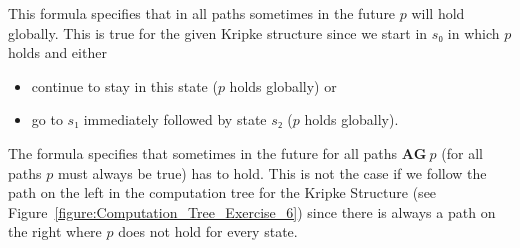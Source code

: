 \begin{description}[style=multiline, leftmargin=3cm]

    \item[$s₀⊧\mathbf{AF}(\mathbf{G}~p)$] This formula specifies that in all
    paths sometimes in the future $p$ will hold globally. This is true for the
    given Kripke structure since we start in $s₀$ in which $p$ holds and either

        \begin{itemize}

            \item continue to stay in this state ($p$ holds globally) or

            \item go to $s₁$ immediately followed by state $s₂$ ($p$ holds
            globally).

        \end{itemize}

    \item[$s₀⊧\mathbf{AF}(\mathbf{AG}~p)$] The formula specifies that
    sometimes in the future for all paths $\mathbf{AG}~p$ (for all paths $p$
    must always be true) has to hold. This is not the case if we follow the
    path on the left in the computation tree for the Kripke Structure (see
    Figure~\ref{figure:Computation_Tree_Exercise_6}) since there is always a
    path on the right where $p$ does not hold for every state.

\end{description}
